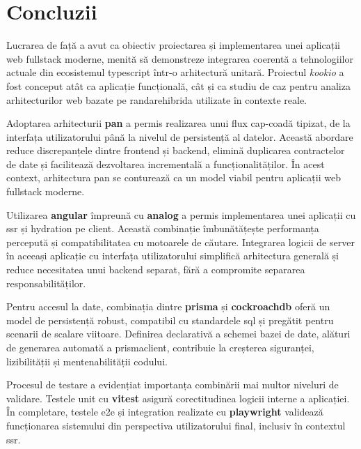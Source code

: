 \section{Concluzii}\label{ch:concl}

Lucrarea de față a avut ca obiectiv proiectarea și implementarea unei aplicații \gls{web} \gls{fullstack} moderne, menită să demonstreze integrarea coerentă a tehnologiilor actuale din ecosistemul \gls{typescript} într-o arhitectură unitară.
Proiectul \textit{\gls{kookio}} a fost conceput atât ca aplicație funcțională, cât și ca studiu de caz pentru analiza arhitecturilor \gls{web} bazate pe \gls{randarehibrida} utilizate în contexte reale.

Adoptarea arhitecturii \textbf{\gls{pan}} a permis realizarea unui flux cap-coadă tipizat, de la interfața utilizatorului până la nivelul de persistență al datelor.
Această abordare reduce discrepanțele dintre \gls{frontend} și \gls{backend}, elimină duplicarea contractelor de date și facilitează dezvoltarea incrementală a funcționalităților.
În acest context, arhitectura \gls{pan} se conturează ca un model viabil pentru aplicații \gls{web} \gls{fullstack} moderne.

Utilizarea \textbf{\gls{angular}} împreună cu \textbf{\gls{analog}} a permis implementarea unei aplicații cu \acrfull{ssr} și \gls{hydration} pe client.
Această combinație îmbunătățește performanța percepută și compatibilitatea cu motoarele de căutare.
Integrarea logicii de server în aceeași aplicație cu interfața utilizatorului simplifică arhitectura generală și reduce necesitatea unui \gls{backend} separat, fără a compromite separarea responsabilităților.

Pentru accesul la date, combinația dintre \textbf{\gls{prisma}} și \textbf{\gls{cockroachdb}} oferă un model de persistență robust, compatibil cu standardele \gls{sql} și pregătit pentru scenarii de scalare viitoare.
Definirea declarativă a schemei bazei de date, alături de generarea automată a \gls{prismaclient}, contribuie la creșterea siguranței, lizibilității și mentenabilității codului.

Procesul de testare a evidențiat importanța combinării mai multor niveluri de validare.
Testele \gls{unit} cu \textbf{\gls{vitest}} asigură corectitudinea logicii interne a aplicației.
În completare, testele \gls{e2e} și \gls{integration} realizate cu \textbf{\gls{playwright}} validează funcționarea sistemului din perspectiva utilizatorului final, inclusiv în contextul \acrshort{ssr}.

